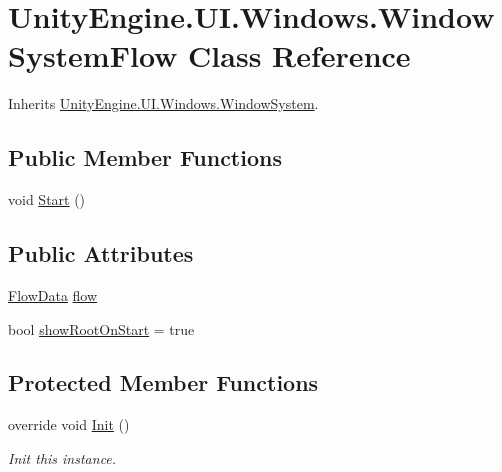 \hypertarget{class_unity_engine_1_1_u_i_1_1_windows_1_1_window_system_flow}{}\section{Unity\+Engine.\+U\+I.\+Windows.\+Window\+System\+Flow Class Reference}
\label{class_unity_engine_1_1_u_i_1_1_windows_1_1_window_system_flow}


Inherits \hyperlink{class_unity_engine_1_1_u_i_1_1_windows_1_1_window_system}{Unity\+Engine.\+U\+I.\+Windows.\+Window\+System}.

\subsection*{Public Member Functions}
\begin{DoxyCompactItemize}
\item 
void \hyperlink{class_unity_engine_1_1_u_i_1_1_windows_1_1_window_system_flow_ace9c7a313b9d815185b38bd78e9495fc}{Start} ()
\end{DoxyCompactItemize}
\subsection*{Public Attributes}
\begin{DoxyCompactItemize}
\item 
\hyperlink{class_unity_engine_1_1_u_i_1_1_windows_1_1_plugins_1_1_flow_1_1_flow_data}{Flow\+Data} \hyperlink{class_unity_engine_1_1_u_i_1_1_windows_1_1_window_system_flow_a996d484f04cfbfefc61390df49361085}{flow}
\item 
bool \hyperlink{class_unity_engine_1_1_u_i_1_1_windows_1_1_window_system_flow_a9152deed40d0f00941d6793aadc52608}{show\+Root\+On\+Start} = true
\end{DoxyCompactItemize}
\subsection*{Protected Member Functions}
\begin{DoxyCompactItemize}
\item 
override void \hyperlink{class_unity_engine_1_1_u_i_1_1_windows_1_1_window_system_flow_a896582fa19099139c3bccaae4c388d19}{Init} ()
\begin{DoxyCompactList}\small\item\em Init this instance. \end{DoxyCompactList}\end{DoxyCompactItemize}

